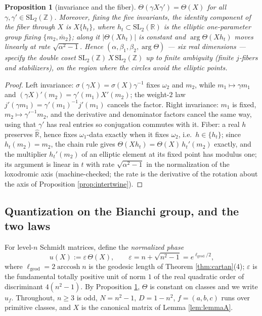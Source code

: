 \documentclass[11pt]{amsart}
\numberwithin{equation}{section}
\theoremstyle{plain}
\newtheorem{proposition}[theorem]{Proposition}
\theoremstyle{definition}
\theoremstyle{remark}
\newcommand{\R}{\mathbb{R}}
\newcommand{\Z}{\mathbb{Z}}
\newcommand{\Rhat}{\widehat{\R}}
\newcommand{\SL}{\mathrm{SL}}
\newcommand{\arccosh}{\operatorname{arccosh}}
\begin{document}
\begin{proposition}[invariance and the fiber]\label{prop:invariance}
$\Theta(\gamma X\gamma') = \Theta(X)$ for all $\gamma, \gamma' \in
\SL_2(\Z)$.  Moreover, fixing the five invariants, the identity
component of the fiber through $X$ is $X\{h_t\}$, where $h_t \subset
\SL_2(\R)$ is the elliptic one-parameter group fixing
$\{m_2, \bar m_2\}$; along it $|\Theta(Xh_t)|$ is constant and
$\arg\Theta(Xh_t)$ moves linearly at rate $\sqrt{\alpha^2 - 1}$.
Hence $(\alpha, \beta_1, \beta_2, \arg\Theta)$ --- six real dimensions
--- specify the double coset $\SL_2(\Z)\,X\,\SL_2(\Z)$ up to finite
ambiguity (finite $j$-fibers and stabilizers), on the region where the
circles avoid the elliptic points.
\end{proposition}

\begin{proof}
Left invariance: $\sigma(\gamma X) = \sigma(X)\gamma^{-1}$ fixes
$\omega_2$ and $m_2$, while $m_1 \mapsto \gamma m_1$ and
$(\gamma X)'(m_2) = \gamma'(m_1)X'(m_2)$; the weight-$2$ law
$j'(\gamma m_1) = \gamma'(m_1)^{-1}j'(m_1)$ cancels the factor.  Right
invariance: $m_1$ is fixed, $m_2 \mapsto \gamma'^{-1}m_2$, and the
derivative and denominator factors cancel the same way, using that
$\gamma'$ has real entries so conjugation commutes with it.  Fiber: a
real $h$ preserves $\Rhat$, hence fixes $\omega_1$-data exactly when it
fixes $\omega_2$, i.e.\ $h \in \{h_t\}$; since $h_t(m_2) = m_2$, the
chain rule gives $\Theta(Xh_t) = \Theta(X)\,h_t'(m_2)$ exactly, and the
multiplier $h_t'(m_2)$ of an elliptic element at its fixed point has
modulus one; its argument is linear in $t$ with rate
$\sqrt{\alpha^2-1}$ in the normalization of the loxodromic axis
(machine-checked; the rate is the derivative of the rotation about the
axis of Proposition \ref{prop:intertwine}).
\end{proof}

\subsection{Quantization on the Bianchi group, and the two laws}
\label{subsec:laws}

For level-$n$ Schmidt matrices, define the \emph{normalized phase}
\[
  u(X) := \varepsilon\,\Theta(X), \qquad
  \varepsilon = n + \sqrt{n^2 - 1} = e^{\ell_{\mathrm{geod}}/2},
\]
where $\ell_{\mathrm{geod}} = 2\arccosh n$ is the geodesic length of
Theorem \ref{thm:cartan}(4); $\varepsilon$ is the fundamental
totally positive unit of norm $1$ of the real quadratic order of
discriminant $4(n^2 - 1)$.  By Proposition \ref{prop:invariance},
$\Theta$ is constant on classes and we write $u_f$.  Throughout,
$n \ge 3$ is odd, $N = n^2 - 1$, $D = 1 - n^2$, $f = (a, b, c)$ runs
over primitive classes, and $X$ is the canonical matrix of Lemma
\ref{lem:lemmaA}.
\end{document}
